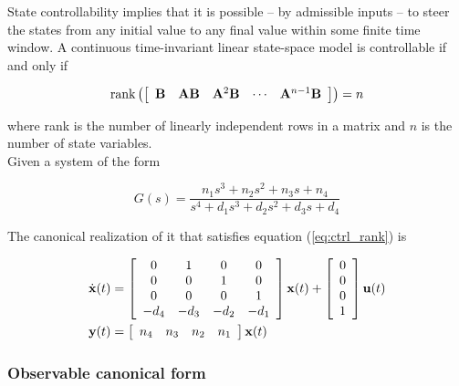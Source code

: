 State controllability implies that it is possible -- by admissible inputs -- to
steer the \glspl{state} from any initial value to any final value within some
finite time window. A continuous \gls{time-invariant} linear state-space
\gls{model} is controllable if and only if

\begin{equation}
  \text{rank} \left(\left[
  \begin{array}{ccccc}
    \mtx{B} & \mtx{A}\mtx{B} & \mtx{A}^2\mtx{B} & \cdots & \mtx{A}^{n-1}\mtx{B}
  \end{array}
  \right]\right) = n
  \label{eq:ctrl_rank}
\end{equation}

where rank is the number of linearly independent rows in a matrix and $n$ is the
number of \gls{state} variables. \\

Given a \gls{system} of the form

\begin{equation} \label{eq:ctrl_obsv_tf}
  G(s) = \frac{n_1 s^3 + n_2 s^2 + n_3 s + n_4}
    {s^4 + d_1 s^3 + d_2 s^2 + d_3 s + d_4}
\end{equation}

The canonical \gls{realization} of it that satisfies equation
(\ref{eq:ctrl_rank}) is

\begin{align}
  \dot{\mathbf{x}}(t) &= \left[
  \begin{array}{cccc}
    0 & 1 & 0 & 0 \\
    0 & 0 & 1 & 0 \\
    0 & 0 & 0 & 1 \\
    -d_4 & -d_3 & -d_2 & -d_1
  \end{array}
  \right] \mathbf{x}(t) + \left[
  \begin{array}{c}
    0 \\
    0 \\
    0 \\
    1
  \end{array}
  \right] \mathbf{u}(t) \\
  \mathbf{y}(t) &= \left[
  \begin{array}{cccc}
    n_4 & n_3 & n_2 & n_1
  \end{array}
  \right] \mathbf{x}(t)
\end{align}

\subsubsection{Observable canonical form} \label{subsubsec:obsv-canon}

